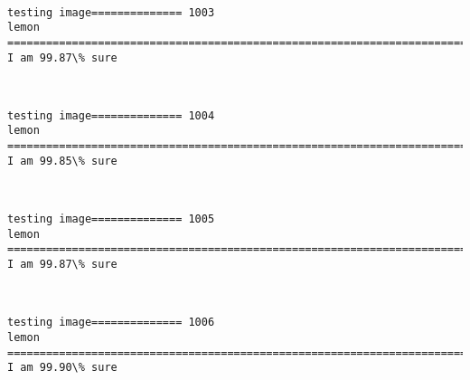 \documentclass[11pt]{article}
\begin{document}
    \begin{center}
    \end{center}
    { \hspace*{\fill} \\}
    
    \begin{Verbatim}[commandchars=\\\{\}]
testing image============== 1003
lemon
============================================================================
I am 99.87\% sure

    \end{Verbatim}

    \begin{center}
    \end{center}
    { \hspace*{\fill} \\}
    
    \begin{Verbatim}[commandchars=\\\{\}]
testing image============== 1004
lemon
============================================================================
I am 99.85\% sure

    \end{Verbatim}

    \begin{center}
    \end{center}
    { \hspace*{\fill} \\}
    
    \begin{Verbatim}[commandchars=\\\{\}]
testing image============== 1005
lemon
============================================================================
I am 99.87\% sure

    \end{Verbatim}

    \begin{center}
    \end{center}
    { \hspace*{\fill} \\}
    
    \begin{Verbatim}[commandchars=\\\{\}]
testing image============== 1006
lemon
============================================================================
I am 99.90\% sure

    \end{Verbatim}
\end{document}
